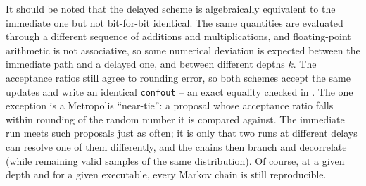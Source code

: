 It should be noted that the delayed scheme is algebraically equivalent to the
immediate one but not bit-for-bit identical. The same quantities are evaluated
through a different sequence of additions and multiplications, and
floating-point arithmetic is not associative, so some numerical deviation is
expected between the immediate path and a delayed one, and between different
depths $k$. The acceptance ratios still agree to rounding
error, so both
schemes accept the same updates and write an identical \texttt{confout} -- an
exact equality checked in . The one exception is a
Metropolis ``near-tie'': a proposal whose acceptance ratio falls within rounding
of the random number it is compared against. The immediate run meets such
proposals just as often; it is only that two runs at different delays can
resolve one of them differently, and
the chains then branch and decorrelate (while remaining valid samples of the
same
distribution). Of course, at a given depth and for a given executable,
every Markov chain is still reproducible.

